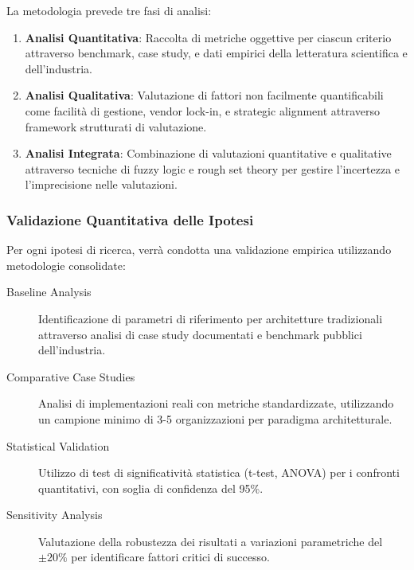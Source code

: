 La metodologia prevede tre fasi di analisi:

\begin{enumerate}
    \item \textbf{Analisi Quantitativa}: Raccolta di metriche oggettive per ciascun criterio attraverso benchmark, case study, e dati empirici della letteratura scientifica e dell'industria.
    
    \item \textbf{Analisi Qualitativa}: Valutazione di fattori non facilmente quantificabili come facilità di gestione, vendor lock-in, e strategic alignment attraverso framework strutturati di valutazione.
    
    \item \textbf{Analisi Integrata}: Combinazione di valutazioni quantitative e qualitative attraverso tecniche di fuzzy logic e rough set theory per gestire l'incertezza e l'imprecisione nelle valutazioni.
\end{enumerate}

\subsubsection{Validazione Quantitativa delle Ipotesi}
\label{subsubsec:validazione-quantitativa}

Per ogni ipotesi di ricerca, verrà condotta una validazione empirica utilizzando metodologie consolidate:

\begin{description}
    \item[Baseline Analysis] Identificazione di parametri di riferimento per architetture tradizionali attraverso analisi di case study documentati e benchmark pubblici dell'industria.
    
    \item[Comparative Case Studies] Analisi di implementazioni reali con metriche standardizzate, utilizzando un campione minimo di 3-5 organizzazioni per paradigma architetturale.
    
    \item[Statistical Validation] Utilizzo di test di significatività statistica (t-test, ANOVA) per i confronti quantitativi, con soglia di confidenza del 95\%.
    
    \item[Sensitivity Analysis] Valutazione della robustezza dei risultati a variazioni parametriche del $\pm 20\%$ per identificare fattori critici di successo.
\end{description}


